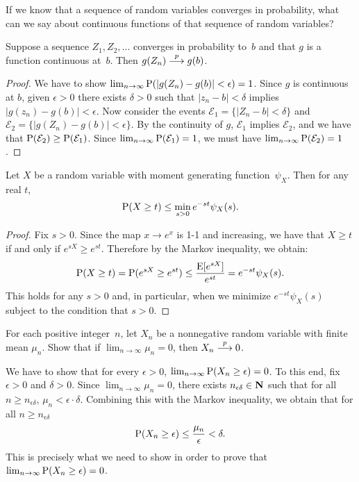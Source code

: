 If we know that a sequence of random variables converges in probability, what 
can we say about continuous functions of that sequence of random variables?
\begin{theorem}
Suppose a sequence $Z_1, Z_2, \ldots$ converges in probability to~$b$ and 
that $g$ is a function continuous at~$b$. Then $g(Z_n) \stackrel{p}{\longrightarrow} g(b)$.
\end{theorem} 
\begin{proof}
We have to show $\lim_{n \to \infty} \operatorname{P} (|g(Z_n) - g(b)| < \epsilon) = 1$. 
Since $g$ is continuous at $b$, given $\epsilon > 0$ there exists $\delta > 0$
such that $|z_n - b| < \delta$ implies $|g(z_n) -  g(b)| < \epsilon$. Now consider
the events $\mathcal{E}_1 = \{ |Z_n - b| < \delta \}$ and 
$\mathcal{E}_2 = \{|g(Z_n) - g(b)| < \epsilon\}$. By the continuity of $g$, 
$\mathcal{E}_1$ implies $\mathcal{E}_2$, and we have that 
$\operatorname{P} (\mathcal{E}_2) \geq \operatorname{P} (\mathcal{E}_1)$. 
Since $\lim_{n \to \infty} \operatorname{P} (\mathcal{E}_1) = 1$, we must have  
$\lim_{n \to \infty} \operatorname{P} (\mathcal{E}_2) = 1$. 
\end{proof}

\begin{theorem}
Let $X$ be a random variable with moment generating function~$\psi_X$. 
Then for any real $t$,
\begin{equation} \label{ineq:chernoff}
\operatorname{P} (X \geq t) \leq \min_{s > 0} e^{- st} \psi_X(s).
\end{equation}
\end{theorem}
\begin{proof}
Fix $s > 0$. Since the map $x \longrightarrow e^x$ is 1-1 and increasing, we 
have that $X \geq t$ if and only if $e^{sX} \geq e^{st}$. Therefore by the 
Markov inequality, we obtain:
\[
    \operatorname{P} (X \geq t) = \operatorname{P} (e^{sX} \geq e^{st}) 
        \leq \frac{\operatorname{E} [e^{sX}]}{e^{st}}
        = e^{- s t} \psi_X(s).
\] 
This holds for any $s > 0$ and, in particular, when we minimize 
$e^{- s t} \psi_X(s)$ subject to the condition that $s > 0$.
\end{proof}


\begin{example}
For each positive integer~$n$, let $X_n$ be a nonnegative random variable 
with finite mean $\mu_n$. Show that if $\lim_{n \to \infty} \mu_n = 0$, 
then $X_n \stackrel{p}{\longrightarrow} 0$.
\begin{solution}
We have to show that for every $\epsilon > 0$, 
$\lim_{n \to \infty} \operatorname{P} (X_n \geq \epsilon) = 0$. To this end, 
fix $\epsilon > 0$ and $\delta > 0$. Since $\lim_{n \to \infty} \mu_n = 0$, there
exists $n_{\epsilon \delta} \in \mathbf{N}$ such that for all $n \geq n_{\epsilon \delta}$, 
$\mu_n < \epsilon \cdot \delta$. Combining this with the 
Markov inequality, we obtain that for all $n \geq n_{\epsilon \delta}$ 
\[
    \operatorname{P} (X_n \geq \epsilon) \leq \frac{\mu_n}{\epsilon} < \delta.
\]
This is precisely what we need to show in order to prove that 
$\lim_{n \to \infty} \operatorname{P} (X_n \geq \epsilon) = 0$.
\end{solution}
\end{example}

